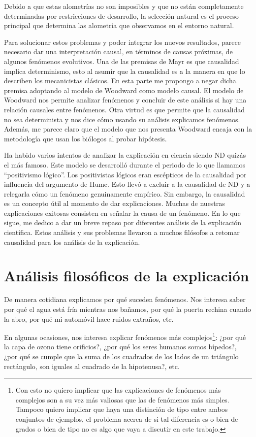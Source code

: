 Debido a que estas alometrías no son imposibles y que no están completamente determinadas por restricciones de desarrollo, la selección natural es el proceso principal que determina las alometría que observamos en el entorno natural.

Para solucionar estos problemas y poder integrar los nuevos resultados, parece necesario dar una interpretación causal, en términos de causas próximas, de algunos fenómenos evolutivos. Una de las premisas de Mayr es que causalidad implica determinismo, esto al asumir que la causalidad es a la manera en que lo describen los mecanicistas clásicos. En esta parte me propongo a negar dicha premisa adoptando al modelo de Woodward como modelo causal. El modelo de Woodward nos permite analizar fenómenos y concluir de este análisis si hay una relación causales entre fenómenos. Otra virtud es que permite que la causalidad no sea determinista y nos dice cómo usando su análisis explicamos fenómenos. Además, me parece claro que el modelo que nos presenta Woodward encaja con la metodología que usan los biólogos al probar hipótesis.

Ha habido varios intentos de analizar la explicación en ciencia siendo ND quizás el más famoso.  Este modelo se desarrolló durante el periodo de lo que llamamos ``positivismo lógico''. Los positivistas lógicos eran escépticos de la causalidad por influencia del argumento de Hume. Esto llevó a excluir a la causalidad de ND y a relegarla cómo un fenómeno genuinamente empírico. Sin embargo, la causalidad es un concepto útil al momento de dar explicaciones. Muchas de nuestras explicaciones exitosas consisten en señalar la causa de un fenómeno. En lo que sigue, me dedico a dar un breve repaso por diferentes análisis de la explicación científica. Estos análisis y sus problemas llevaron a muchos filósofos a retomar causalidad para los análisis de la explicación.

\section{Análisis filosóficos de la explicación}

\noindent De manera cotidiana explicamos por qué suceden fenómenos. Nos interesa saber por qué el agua está fría mientras nos bañamos, por qué la puerta rechina cuando la abro, por qué mi automóvil hace ruidos extraños, etc.

En algunas ocasiones, nos interesa explicar fenómenos más complejos\footnote{Con esto no quiero implicar que las explicaciones de fenómenos más complejos son a su vez más valiosas que las de fenómenos más simples. Tampoco quiero implicar que haya una distinción de tipo entre ambos conjuntos de ejemplos, el problema acerca de si tal diferencia es o bien de grados o bien de tipo no es algo que vaya a discutir en este trabajo.}: ¿por qué la capa de ozono tiene orificios?, ¿por qué los seres humanos somos bípedos?, ¿por qué se cumple que la suma de los cuadrados de los lados de un triángulo rectángulo, son iguales al cuadrado de la hipotenusa?, etc.

